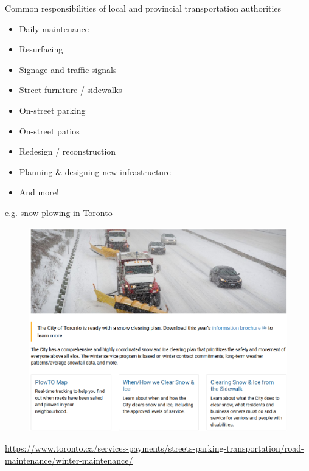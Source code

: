 \documentclass[aspectratio=169]{beamer}
\begin{document}
\begin{frame}
	
	Common responsibilities of local and provincial transportation authorities
	
	\begin{itemize}
		\item Daily maintenance
		\item Resurfacing
		\item Signage and traffic signals
		\item Street furniture / sidewalks
		\item On-street parking
		\item On-street patios
		\item Redesign / reconstruction
		\item Planning \& designing new infrastructure
		\item And more!
	\end{itemize}
	
\end{frame}


\begin{frame}
	
	e.g. snow plowing in Toronto
	
	\begin{figure}
		\centering
		\includegraphics[width=0.7\linewidth]{images/winter_to.png}
	\end{figure}

	\tiny\url{https://www.toronto.ca/services-payments/streets-parking-transportation/road-maintenance/winter-maintenance/}
	
\end{frame}
\end{document}

